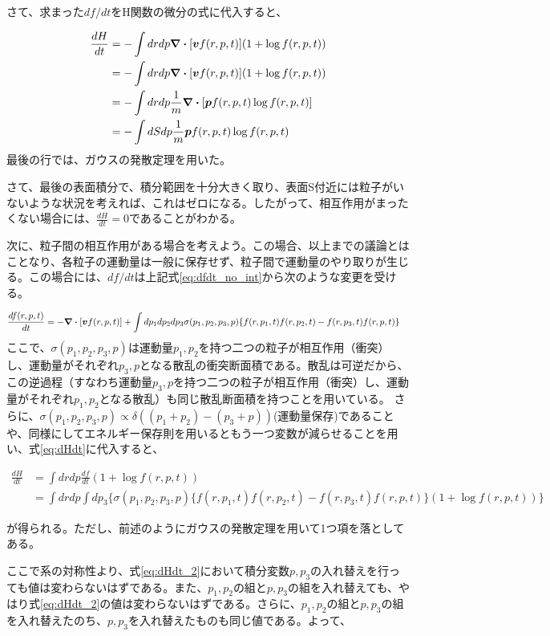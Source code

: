 \documentclass[uplatex,dvipdfmx]{jsarticle}
\begin{document}
さて、求まった$df/dt$をH関数の微分の式に代入すると、

\begin{align*}
    \frac{dH}{dt} &= - \int drdp \div[\vb*{v}f(r,p,t)](1+\log f(r,p,t)) \\
        &= - \int drdp \div[\vb*{v}f(r,p,t)](1+\log f(r,p,t)) \\
        &= - \int drdp \frac{1}{m} \div[\vb*{p}f(r,p,t) \log f(r,p,t)] \\
        &= - \int dSdp \frac{1}{m} \vb*{p}f(r,p,t) \log f(r,p,t)
\end{align*}
最後の行では、ガウスの発散定理を用いた。

さて、最後の表面積分で、積分範囲を十分大きく取り、表面S付近には粒子がいないような状況を考えれば、これはゼロになる。したがって、相互作用がまったくない場合には、$\frac{dH}{dt}=0$であることがわかる。

\vspace{1cm}

次に、粒子間の相互作用がある場合を考えよう。この場合、以上までの議論とはことなり、各粒子の運動量は一般に保存せず、粒子間で運動量のやり取りが生じる。この場合には、$df/dt$は上記式\ref{eq:dfdt_no_int}から次のような変更を受ける。

\begin{align}
    \frac{df(r,p,t)}{dt} &= - \div [\vb*{v}f(r,p,t)] + \int dp_1dp_2dp_3 \sigma(p_1,p_2,p_3,p) \{f(r,p_1,t)f(r,p_2,t)-f(r, p_3, t)f(r, p,t)\}
\end{align}
ここで、$\sigma(p_1,p_2,p_3,p)$は運動量$p_1,p_2$を持つ二つの粒子が相互作用（衝突）し、運動量がそれぞれ$p_3,p$となる散乱の衝突断面積である。散乱は可逆だから、この逆過程（すなわち運動量$p_3,p$を持つ二つの粒子が相互作用（衝突）し、運動量がそれぞれ$p_1,p_2$となる散乱）も同じ散乱断面積を持つことを用いている。
さらに、$\sigma(p_1,p_2,p_3,p) \propto \delta((p_1+p_2)-(p_3+p))$(運動量保存)であることや、同様にしてエネルギー保存則を用いるともう一つ変数が減らせることを用い、式\ref{eq:dHdt}に代入すると、

\begin{align}
    \frac{dH}{dt} &= \int drdp \frac{df}{dt}(1+\log f(r,p,t))\\
        &= \int drdp \int dp_3 \{\sigma(p_1,p_2,p_3,p) \{f(r,p_1,t)f(r,p_2,t)-f(r, p_3, t)f(r, p,t)\}(1+\log f(r,p,t))\} \label{eq:dHdt_2}
\end{align}

が得られる。ただし、前述のようにガウスの発散定理を用いて1つ項を落としてある。

ここで系の対称性より、式\ref{eq:dHdt_2}において積分変数$p,p_3$の入れ替えを行っても値は変わらないはずである。また、$p_1,p_2$の組と$p,p_3$の組を入れ替えても、やはり式\ref{eq:dHdt_2}の値は変わらないはずである。さらに、$p_1,p_2$の組と$p,p_3$の組を入れ替えたのち、$p, p_3$を入れ替えたものも同じ値である。よって、
\end{document}
